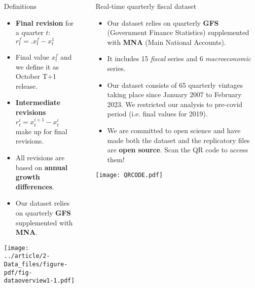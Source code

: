 \documentclass[final]{beamer}
\newlength{\sepwidth}
\newlength{\colwidth}
\newcommand{\separatorcolumn}{\begin{column}{\sepwidth}\end{column}}
\begin{document}
\begin{frame}[t]
\begin{columns}[t]
\begin{column}{\colwidth}
  \begin{block}{Definitions}
    \begin{itemize}
      \item \textbf{Final revision} for a quarter $t$: $r_t^f =. x_t^f - x_t^1$
      \item Final value $x_t^f$ and we define it as October T+1 release.
      \item \textbf{Intermediate revisions} $r_t^i = x_t^{i+1} - x_t^i$ make up for final revisions.
      \item All revisions are based on \textbf{annual growth differences}.
      \item Our dataset relies on quarterly \textbf{GFS} supplemented with \textbf{MNA}.
  \end{itemize}
  \end{block}

  \texttt{[image: ../article/2-Data\_files/figure-pdf/fig-dataoverview1-1.pdf]} 

\end{column}

\separatorcolumn

\begin{column}{\colwidth}

  \begin{block}{Real-time quarterly fiscal dataset}
    \begin{itemize}
      \item Our dataset relies on quarterly \textbf{GFS} (Government Finance Statistics) supplemented with \textbf{MNA} (Main National Accounts).
      \item It includes 15 \textit{fiscal} series and 6 \textit{macroeconomic} series. 
      \item Our dataset consists of 65 quarterly vintages taking place since January 2007 to February 2023. We restricted our analysis to pre-covid period (i.e. final values for 2019).
      \item We are committed to open science and have made both the dataset and the replicatory files are \textbf{open source}. Scan the QR code to access them!
    \end{itemize}

  \begin{center}
    \texttt{[image: QRCODE.pdf]}
  \end{center}

  \end{block}


\end{column}
\end{columns}
\end{frame}
\end{document}
